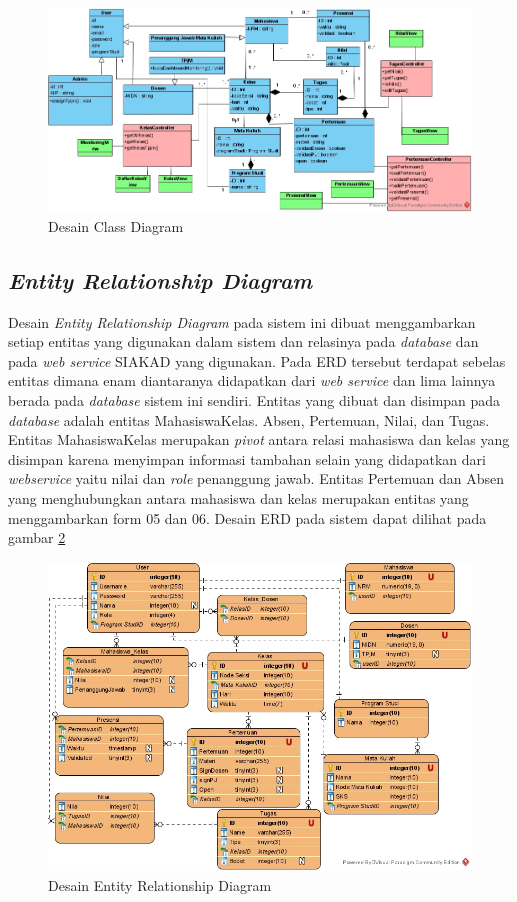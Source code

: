 \begin{figure}[H]
	\centering
	\includegraphics[width=1\textwidth]{gambar/diagram/Class Diagram Fix}
	\caption{Desain Class Diagram}
	\label{fig:classdiagram}
\end{figure}


\subsection{\textit{Entity Relationship Diagram}}
	Desain \textit{Entity Relationship Diagram} pada sistem ini dibuat menggambarkan setiap entitas yang digunakan dalam sistem dan relasinya pada \textit{database} dan pada \textit{web service} SIAKAD yang digunakan. Pada ERD tersebut terdapat sebelas entitas dimana enam diantaranya didapatkan dari \textit{web service} dan lima lainnya berada pada \textit{database} sistem ini sendiri. Entitas yang dibuat dan disimpan pada \textit{database} adalah entitas MahasiswaKelas. Absen, Pertemuan, Nilai, dan Tugas. Entitas MahasiswaKelas merupakan \textit{pivot} antara relasi mahasiswa dan kelas yang disimpan karena menyimpan informasi tambahan selain yang didapatkan dari \textit{webservice} yaitu nilai dan \textit{role} penanggung jawab. Entitas Pertemuan dan Absen yang menghubungkan antara mahasiswa dan kelas merupakan entitas yang menggambarkan form 05 dan 06. Desain ERD pada sistem dapat dilihat pada gambar \ref{fig:erd}

\begin{figure}[h!]
	\centering
	\includegraphics[width=1\textwidth]{gambar/diagram/Entity Relationship Diagram2}
	\caption{Desain Entity Relationship Diagram}
	\label{fig:erd}
\end{figure}


